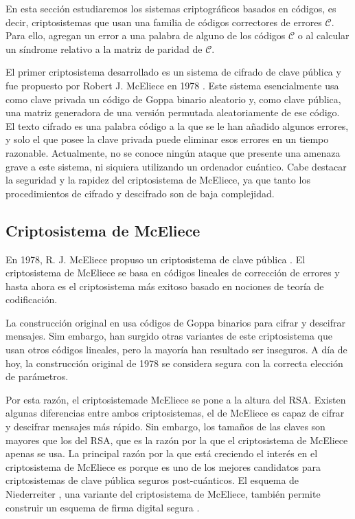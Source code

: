 En esta sección estudiaremos los sistemas criptográficos basados en códigos, es decir, criptosistemas que usan una familia de códigos correctores de errores $\mathcal{C}$. Para ello, agregan un error a una palabra de alguno de los códigos $\mathcal{C}$ o al calcular un síndrome relativo a la matriz de paridad de $\mathcal{C}$.

El primer criptosistema desarrollado es un sistema de cifrado de clave pública y fue propuesto por Robert J. McEliece en 1978 \cite{McEliece_1978}. Este sistema esencialmente usa como clave privada un código de Goppa binario aleatorio y, como clave pública, una matriz generadora de una versión permutada aleatoriamente de ese código. El texto cifrado es una palabra código a la que se le han añadido algunos errores, y solo el que posee la clave privada puede eliminar esos errores en un tiempo razonable. Actualmente, no se conoce ningún ataque que presente una amenaza grave a este sistema, ni siquiera utilizando un ordenador cuántico. Cabe destacar la seguridad y la rapidez del criptosistema de McEliece, ya que tanto los procedimientos de cifrado y descifrado son de baja complejidad.

\subsection{Criptosistema de McEliece}

En 1978, R. J. McEliece propuso un criptosistema de clave pública \cite{McEliece_1978}. El criptosistema de McEliece se basa en códigos lineales de corrección de errores y hasta ahora es el criptosistema más exitoso basado en nociones de teoría de codificación.

La construcción original en \cite{McEliece_1978} usa códigos de Goppa binarios para cifrar y descifrar mensajes. Sim embargo, han surgido otras variantes de este criptosistema que usan otros códigos lineales, pero la mayoría han resultado ser inseguros. A día de hoy, la construcción original de 1978 se considera segura con la correcta elección de parámetros.

Por esta razón, el criptosistemade McEliece se pone a la altura del RSA. Existen algunas diferencias entre ambos criptosistemas, el de McEliece es capaz de cifrar y descifrar mensajes más rápido. Sin embargo, los tamaños de las claves son mayores que los del RSA, que es la razón por la que el criptosistema de McEliece apenas se usa. La principal razón por la que está creciendo el interés en el criptosistema de McEliece es porque es uno de los mejores candidatos para criptosistemas de clave pública seguros post-cuánticos. El esquema de Niederreiter \cite{Niederreiter_1986}, una variante del criptosistema de McEliece, también permite construir un esquema de firma digital segura \cite[Sección 4]{Niederreiter_signature_2001} \cite{Advances_cryptology}.

